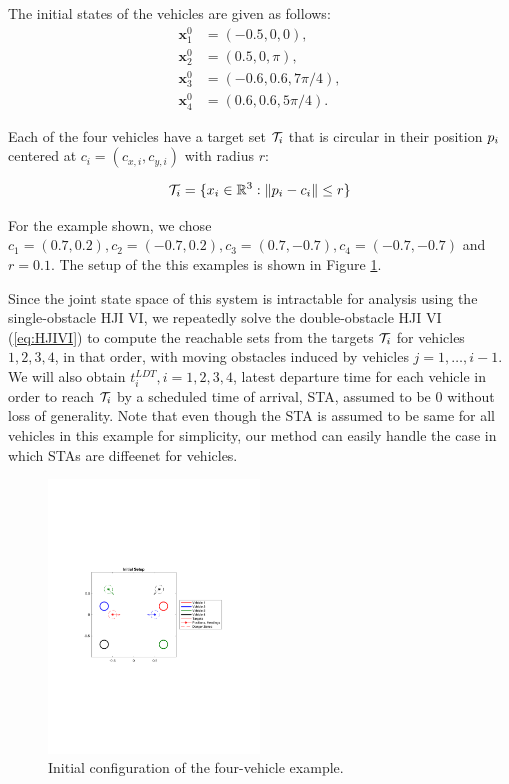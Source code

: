 The initial states of the vehicles are given as follows:
\begin{equation}
\begin{aligned}
\bm{x}_1^0 &= (-0.5, 0, 0), \\
\bm{x}_2^0 &= (0.5, 0, \pi), \\
\bm{x}_3^0 &= \left(-0.6, 0.6, 7\pi/4\right), \\
\bm{x}_4^0 &= \left(0.6, 0.6, 5\pi/4\right).\
\end{aligned}
\end{equation}

\noindent Each of the four vehicles have a target set $\mathcal{T}_i$ that is circular in their position $p_i$ centered at $c_i = (c_{x,i}, c_{y,i})$ with radius $r$:

\begin{equation}
\mathcal{T}_i = \{x_i \in \mathbb{R}^3: \|p_i - c_i\| \le r\}
\end{equation}

\noindent For the example shown, we chose $c_1 = (0.7, 0.2), c_2 = (-0.7, 0.2), c_3 = (0.7, -0.7), c_4 = (-0.7, -0.7)$ and $r = 0.1$. The setup of the this examples is shown in Figure \ref{fig:init_setup}.

Since the joint state space of this system is intractable for analysis using the single-obstacle HJI VI, we repeatedly solve the double-obstacle HJI VI (\ref{eq:HJIVI}) to compute the reachable sets from the targets $\mathcal{T}_i$ for vehicles $1,2,3,4$, in that order, with moving obstacles induced by vehicles $j=1,\ldots,i-1$. We will also obtain $t_i^{LDT},i=1,2,3,4$, latest departure time for each vehicle in order to reach $\mathcal{T}_i$ by a scheduled time of arrival, STA, assumed to be $0$ without loss of generality. Note that even though the STA is assumed to be same for all vehicles in this example for simplicity, our method can easily handle the case in which STAs are diffeenet for vehicles.

\begin{figure}
  \centering
  \includegraphics[width=0.5\textwidth]{"fig/init_setup"}
  \caption{Initial configuration of the four-vehicle example.}
  \label{fig:init_setup}
\end{figure}

